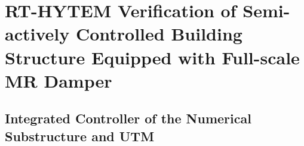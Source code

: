 









\section{RT-HYTEM Verification of Semi-actively Controlled Building Structure Equipped with Full-scale MR Damper}
\subsection{Integrated Controller of the Numerical Substructure and UTM}

